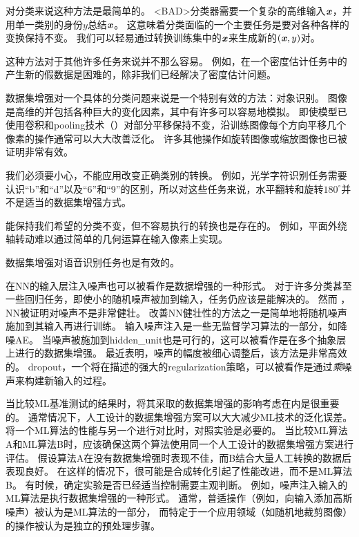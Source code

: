 对分类来说这种方法是最简单的。
<BAD>分类器需要一个复杂的高维输入$\boldsymbol{\mathit{x}}$，并用单一类别的身份$y$总结$\boldsymbol{\mathit{x}}$。
这意味着分类面临的一个主要任务是要对各种各样的变换保持不变。
我们可以轻易通过转换训练集中的$\boldsymbol{\mathit{x}}$来生成新的$(\boldsymbol{\mathit{x}}, y)$对。

这种方法对于其他许多任务来说并不那么容易。
例如，在一个密度估计任务中的产生新的假数据是困难的，除非我们已经解决了密度估计问题。

数据集增强对一个具体的分类问题来说是一个特别有效的方法：对象识别。
图像是高维的并包括各种巨大的变化因素，其中有许多可以容易地模拟。
即使模型已使用卷积和\gls{pooling}技术（）对部分平移保持不变，沿训练图像每个方向平移几个像素的操作通常可以大大改善泛化。
许多其他操作如旋转图像或缩放图像也已被证明非常有效。

我们必须要小心，不能应用改变正确类别的转换。
例如，光学字符识别任务需要认识``b''和``d''以及``6''和``9''的区别，所以对这些任务来说，水平翻转和旋转$180^{\circ}$并不是适当的数据集增强方式。


能保持我们希望的分类不变，但不容易执行的转换也是存在的。
例如，平面外绕轴转动难以通过简单的几何运算在输入像素上实现。

数据集增强对语音识别任务也是有效的\citep{Jaitly_VTLP_2013}。

在\gls{NN}的输入层注入噪声\citep{SietsmaDow91}也可以被看作是数据增强的一种形式。
对于许多分类甚至一些回归任务，即使小的随机噪声被加到输入，任务仍应该是能解决的。
然而 ，\gls{NN}被证明对噪声不是非常健壮\citep{TangElias10}。
改善\gls{NN}健壮性的方法之一是简单地将随机噪声施加到其输入再进行训练。
输入噪声注入是一些无监督学习算法的一部分，如降噪\gls{AE}\citep{VincentPLarochelleH2008}。
当噪声被施加到\gls{hidden_unit}也是可行的，这可以被看作是在多个抽象层上进行的数据集增强。
\cite{Poole14}最近表明，噪声的幅度被细心调整后，该方法是非常高效的。
\gls{dropout}，一个将在描述的强大的\gls{regularization}策略，可以被看作是通过\emph{乘}噪声来构建新输入的过程。

当比较\gls{ML}基准测试的结果时，将其采取的数据集增强的影响考虑在内是很重要的。
通常情况下，人工设计的数据集增强方案可以大大减少\gls{ML}技术的泛化误差。
将一个\gls{ML}算法的性能与另一个进行对比时，对照实验是必要的。
当比较\gls{ML}算法A和\gls{ML}算法B时，应该确保这两个算法使用同一个人工设计的数据集增强方案进行评估。
假设算法A在没有数据集增强时表现不佳，而B结合大量人工转换的数据后表现良好。
在这样的情况下，很可能是合成转化引起了性能改进，而不是\gls{ML}算法B。 
有时候，确定实验是否已经适当控制需要主观判断。
例如，噪声注入输入的\gls{ML}算法是执行数据集增强的一种形式。
通常，普适操作（例如，向输入添加高斯噪声）被认为是\gls{ML}算法的一部分，
而特定于一个应用领域（如随机地裁剪图像）的操作被认为是独立的预处理步骤。

